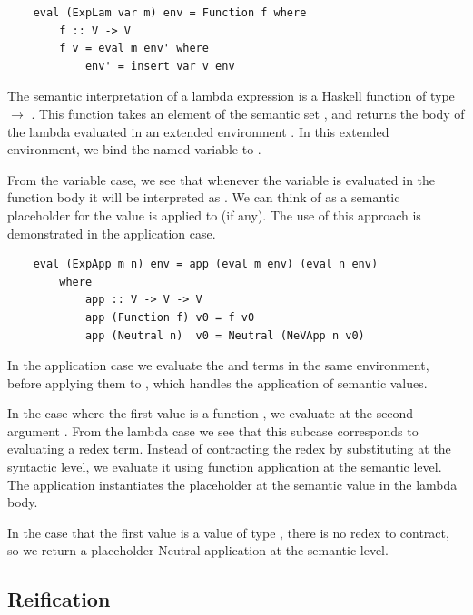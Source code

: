 \begin{lstlisting}
    eval (ExpLam var m) env = Function f where
        f :: V -> V
        f v = eval m env' where
            env' = insert var v env
\end{lstlisting}

The semantic interpretation of a lambda expression is a Haskell function of type  $\rightarrow$ . This function takes an element  of the semantic set , and returns the body of the lambda evaluated in an extended environment . In this extended environment, we bind the named variable  to .

From the variable case, we see that whenever the variable  is evaluated in the function body it will be interpreted as . We can think of  as a semantic placeholder for the value  is applied to (if any). The use of this approach is demonstrated in the application case.

\begin{lstlisting}
    eval (ExpApp m n) env = app (eval m env) (eval n env)
        where
            app :: V -> V -> V
            app (Function f) v0 = f v0
            app (Neutral n)  v0 = Neutral (NeVApp n v0)
\end{lstlisting}

In the application case we evaluate the  and  terms in the same environment, before applying them to , which handles the application of semantic values. 

In the case where the first value is a function , we evaluate  at the second argument . From the lambda case we see that this subcase corresponds to evaluating a redex term. Instead of contracting the redex by substituting at the syntactic level, we evaluate it using function application at the semantic level. The application instantiates the placeholder  at the semantic value  in the lambda body. 

In the case that the first value is a value  of type , there is no redex to contract, so we return a placeholder Neutral application at the semantic level.

\subsection{Reification}

